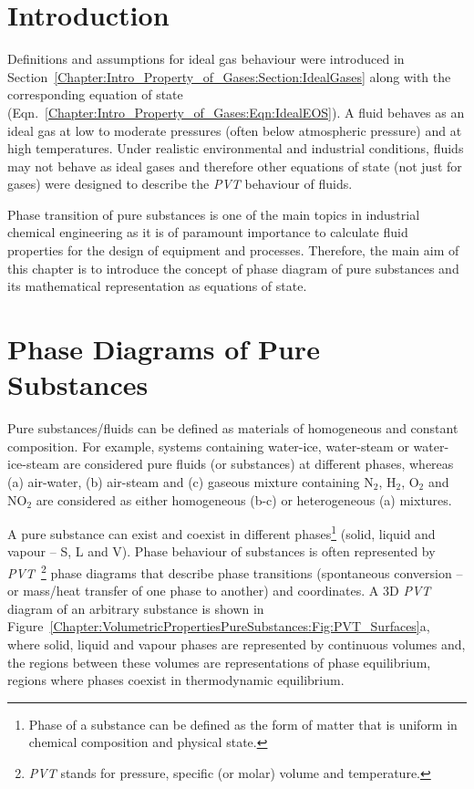 \localtableofcontents

   \section{Introduction}\label{Chapter:VolumetricPropertiesPureSubstances:Section:Intro}
   Definitions and assumptions for ideal gas behaviour were introduced in Section~\ref{Chapter:Intro_Property_of_Gases:Section:IdealGases} along with the corresponding equation of state (Eqn.~\ref{Chapter:Intro_Property_of_Gases:Eqn:IdealEOS}). A fluid behaves as an ideal gas at low to moderate pressures (often below atmospheric pressure) and at high temperatures. Under realistic environmental and industrial conditions, fluids may not behave as ideal gases and therefore other equations of state (not just for gases) were designed to describe the {\it PVT} behaviour of fluids.

Phase transition of pure substances is one of the main topics in industrial chemical engineering as it is of paramount importance to calculate fluid properties for the design of equipment and processes. Therefore, the main aim of this chapter is to introduce the concept of phase diagram of pure substances and its mathematical representation as equations of state. 

  
   \section{Phase Diagrams of Pure Substances}\label{Chapter:VolumetricPropertiesPureSubstances:Section:PhaseDiagrams}

Pure substances/fluids can be defined as materials of homogeneous and constant composition. For example, systems containing water-ice, water-steam or water-ice-steam are considered pure fluids (or substances) at different phases, whereas (a) air-water, (b) air-steam and (c) gaseous mixture containing N$_{2}$, H$_{2}$, O$_{2}$ and NO$_{2}$ are considered as either homogeneous (b-c) or heterogeneous (a) mixtures.

A pure substance can exist and coexist in different phases\footnote{Phase of a substance can be defined as the form of matter that is uniform in chemical composition and physical state.}  (\ie solid, liquid and vapour -- S, L and V). Phase behaviour of substances is often represented by {\it PVT}~\footnote{{\it PVT} stands for pressure, specific (or molar) volume and temperature.} phase diagrams that describe phase transitions (\ie spontaneous conversion -- or mass/heat transfer of one phase to another) and coordinates. A 3D {\it PVT} diagram of an arbitrary substance is shown in Figure~\ref{Chapter:VolumetricPropertiesPureSubstances:Fig:PVT_Surfaces}a, where solid, liquid and vapour phases are represented by continuous volumes and, the regions between these volumes are representations of phase equilibrium, \ie regions where phases coexist in thermodynamic equilibrium.

